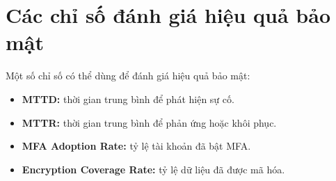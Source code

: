 \section{Các chỉ số đánh giá hiệu quả bảo mật}
Một số chỉ số có thể dùng để đánh giá hiệu quả bảo mật:
\begin{itemize}
    \item \textbf{MTTD:} thời gian trung bình để phát hiện sự cố.
    \item \textbf{MTTR:} thời gian trung bình để phản ứng hoặc khôi phục.
    \item \textbf{MFA Adoption Rate:} tỷ lệ tài khoản đã bật MFA.
    \item \textbf{Encryption Coverage Rate:} tỷ lệ dữ liệu đã được mã hóa.
\end{itemize}
